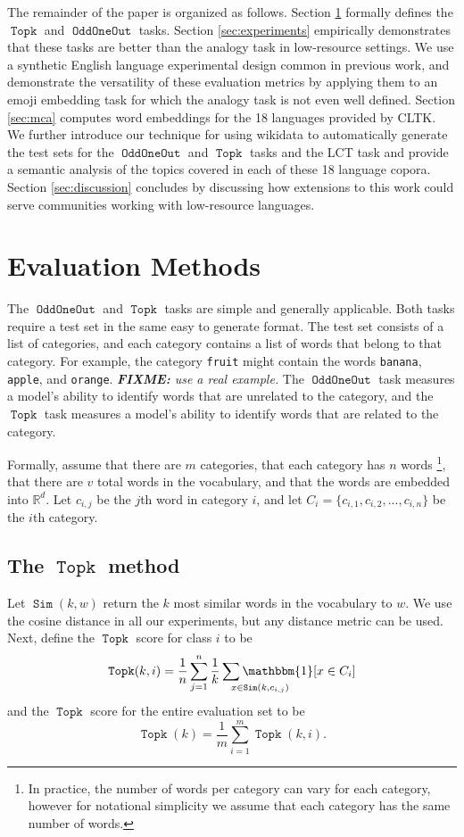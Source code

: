 \documentclass[11pt,a4paper]{article}
\newcommand{\indicator}[1]{\mathbbm{1}\!\left[{#1}\right]}
\newcommand{\R}{\mathbb R}
\DeclareMathOperator{\FindMostSimilar}{\texttt{Sim}}
\DeclareMathOperator{\OddOneOut}{\texttt{OddOneOut}}
\DeclareMathOperator{\topk}{\texttt{Topk}}
\newcommand{\fixme}[1]{{\color{red}\itshape \textbf{FIXME:} {#1}}}
\begin{document}
The remainder of the paper is organized as follows.
Section \ref{sec:method} formally defines the $\topk$ and $\OddOneOut$ tasks.
Section \ref{sec:experiments} empirically demonstrates that these tasks are better than the analogy task in low-resource settings.
We use a synthetic English language experimental design common in previous work,
and demonstrate the versatility of these evaluation metrics by applying them to an emoji embedding task for which the analogy task is not even well defined.
Section \ref{sec:mca} computes word embeddings for the 18 languages provided by CLTK.
We further introduce our technique for using wikidata to automatically generate the test sets for the $\OddOneOut$ and $\topk$ tasks and the LCT task and provide a semantic analysis of the topics covered in each of these 18 language copora.
Section \ref{sec:discussion} concludes by discussing how extensions to this work could serve communities working with low-resource languages.

\section{Evaluation Methods}
\label{sec:method}
The $\OddOneOut$ and $\topk$ tasks are simple and generally applicable.
Both tasks require a test set in the same easy to generate format.
The test set consists of a list of categories,
and each category contains a list of words that belong to that category.
For example, the category \texttt{fruit} might contain the words \texttt{banana}, \texttt{apple}, and \texttt{orange}. \fixme{use a real example.}
The $\OddOneOut$ task measures a model's ability to identify words that are unrelated to the category,
and the $\topk$ task measures a model's ability to identify words that are related to the category.

Formally,
assume that there are $m$ categories,
that each category has $n$ words%
\footnote{
    In practice, the number of words per category can vary for each category,
    however for notational simplicity we assume that each category has the same number of words.
},
that there are $v$ total words in the vocabulary,
and that the words are embedded into $\R^d$.
Let $c_{i,j}$ be the $j$th word in category $i$,
and let $C_i = \{c_{i,1}, c_{i,2}, ..., c_{i,n}\}$ be the $i$th category.

\subsection{The $\topk$ method}
Let $\FindMostSimilar(k,w)$ return the $k$ most similar words in the vocabulary to $w$.
We use the cosine distance in all our experiments,
but any distance metric can be used.
Next, define the $\topk$ score for class $i$ to be
\begin{equation}
    \topk(k,i) = \frac{1}{n}\sum_{j=1}^n \frac{1}{k}\sum_{\mathrlap{x \in \FindMostSimilar(k, c_{i,j})}} \indicator{x \in C_i}
\end{equation}
and the $\topk$ score for the entire evaluation set to be
\begin{equation}
    \topk(k) = \frac{1}{m}\sum_{i=1}^m \topk(k,i)
    .
\end{equation}
\end{document}
